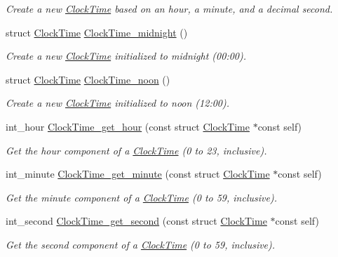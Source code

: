 \begin{DoxyCompactItemize}
\begin{DoxyCompactList}\small\item\em \-Create a new \hyperlink{structClockTime}{\-Clock\-Time} based on an hour, a minute, and a decimal second. \end{DoxyCompactList}\item 
struct \hyperlink{structClockTime}{\-Clock\-Time} \hyperlink{clock-time_8h_ae320c2e30dedf0b33d5306b9e8841261}{\-Clock\-Time\-\_\-midnight} ()
\begin{DoxyCompactList}\small\item\em \-Create a new \hyperlink{structClockTime}{\-Clock\-Time} initialized to midnight (00\-:00). \end{DoxyCompactList}\item 
struct \hyperlink{structClockTime}{\-Clock\-Time} \hyperlink{clock-time_8h_a183049a7386a7b7377ba3059d15485c4}{\-Clock\-Time\-\_\-noon} ()
\begin{DoxyCompactList}\small\item\em \-Create a new \hyperlink{structClockTime}{\-Clock\-Time} initialized to noon (12\-:00). \end{DoxyCompactList}\item 
int\-\_\-hour \hyperlink{clock-time_8h_a1688a98fb161dc7a743085b09cb3c1de}{\-Clock\-Time\-\_\-get\-\_\-hour} (const struct \hyperlink{structClockTime}{\-Clock\-Time} $\ast$const self)
\begin{DoxyCompactList}\small\item\em \-Get the hour component of a \hyperlink{structClockTime}{\-Clock\-Time} (0 to 23, inclusive). \end{DoxyCompactList}\item 
int\-\_\-minute \hyperlink{clock-time_8h_a3ea78f71041658c2f9530c3603b7b9ec}{\-Clock\-Time\-\_\-get\-\_\-minute} (const struct \hyperlink{structClockTime}{\-Clock\-Time} $\ast$const self)
\begin{DoxyCompactList}\small\item\em \-Get the minute component of a \hyperlink{structClockTime}{\-Clock\-Time} (0 to 59, inclusive). \end{DoxyCompactList}\item 
int\-\_\-second \hyperlink{clock-time_8h_a77c448c2991009dbcb662696a7ceedca}{\-Clock\-Time\-\_\-get\-\_\-second} (const struct \hyperlink{structClockTime}{\-Clock\-Time} $\ast$const self)
\begin{DoxyCompactList}\small\item\em \-Get the second component of a \hyperlink{structClockTime}{\-Clock\-Time} (0 to 59, inclusive). \end{DoxyCompactList}\item 

\end{DoxyCompactItemize}
